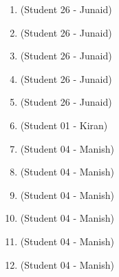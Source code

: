 \begin{enumerate}[label=\#\arabic*]
\item \cite{hostettler2016real} (Student 26 - Junaid)
\item \cite{dai2012making} (Student 26 - Junaid)
\item \cite{lei2013design} (Student 26 - Junaid)
\item \cite{gabric2025constructing} (Student 26 - Junaid)
\item \cite{mao2025homomorphism} (Student 26 - Junaid)
\item \cite{etzion2024pseduo} (Student 01 - Kiran)
\item \cite{petriu1993two} (Student 04 - Manish)
\item \cite{lavoie20043d} (Student 04 - Manish)
\item \cite{desjardins2007dense} (Student 04 - Manish)
\item \cite{geng2011structured} (Student 04 - Manish)
\item \cite{bardell1986pseudorandom} (Student 04 - Manish)
\item \cite{petriu1993environment} (Student 04 - Manish)
\end{enumerate}
